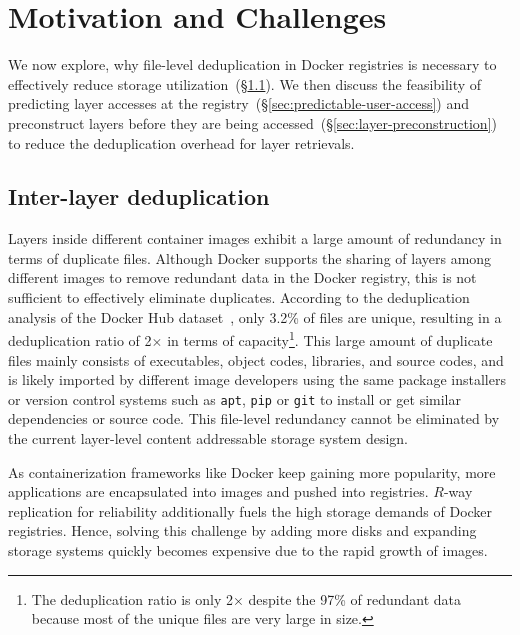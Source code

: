 \section{Motivation and Challenges}
\label{sec:dataset-analysis}

We now explore, why file-level deduplication in Docker registries is necessary to
effectively reduce storage utilization~(\S\ref{sec:inter-layer-deduplication}).
We then discuss the feasibility of predicting layer accesses at the
registry~(\S\ref{sec:predictable-user-access}) and preconstruct layers before they
are being accessed~(\S\ref{sec:layer-preconstruction}) to reduce the deduplication
overhead for layer retrievals.

\subsection{Inter-layer deduplication}
\label{sec:inter-layer-deduplication}

Layers inside different container images exhibit a large amount of redundancy
in terms of duplicate files.
%
Although Docker
supports the sharing of layers among different images to remove redundant data in the
Docker registry,
this is not sufficient to effectively eliminate duplicates.
%
According to the deduplication analysis of the Docker Hub
dataset~\cite{dedupanalysis}, only 3.2\% of files are unique, resulting in
a deduplication ratio of 2$\times$ in terms of
capacity\footnote{The deduplication ratio is only 2$\times$ despite the 97\% of redundant data
because most of the unique files are very large in size.}.
%
This large amount of duplicate files
mainly consists of executables, object codes, libraries, and
source codes, and is likely imported by different image developers using the same
package installers or version control systems such as \texttt{apt},
\texttt{pip} or \texttt{git} to install or get similar dependencies or source
code.  
%
This file-level redundancy cannot be eliminated by the current layer-level content addressable
storage system design.

As containerization frameworks like Docker keep gaining more
popularity, more applications are encapsulated into images and pushed into
registries.
%
$R$-way replication for reliability additionally fuels the high storage demands
of Docker registries.
%
Hence, solving this challenge by adding more disks and expanding storage systems
quickly becomes expensive due to the rapid growth of images.
 
